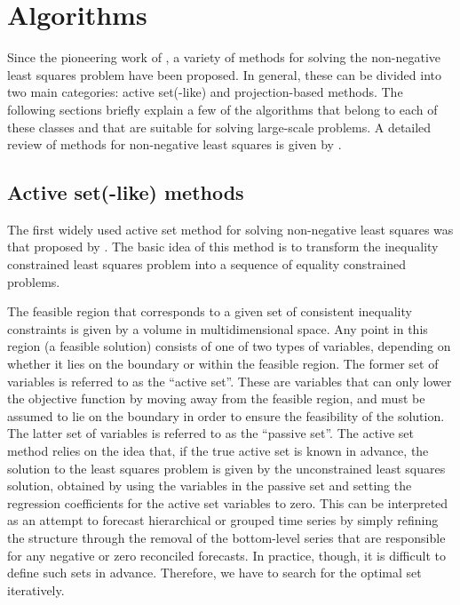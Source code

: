\documentclass[11pt]{article}
\newcommand{\0}{\phantom{0}}
\begin{document}
\section{Algorithms}\label{sec:quadalgo}

Since the pioneering work of \citet{Lawson1974}, a variety of methods for solving the non-negative least squares problem have been proposed. In general, these can be divided into two main categories: active set(-like) and projection-based methods. The following sections briefly explain a few of the algorithms that belong to each of these classes and that are suitable for solving large-scale problems. A detailed review of methods for non-negative least squares is given by \citet{Chen2009}.

\subsection{Active set(-like) methods}

The first widely used active set method for solving non-negative least squares was that proposed by \citet{Lawson1974}. The basic idea of this method is to transform the inequality constrained least squares problem into a sequence of equality constrained problems.

The feasible region that corresponds to a given set of consistent inequality constraints is given by a volume in multidimensional space. Any point in this region (a feasible solution) consists of one of two types of variables, depending on whether it lies on the boundary or within the feasible region. The former set of variables is referred to as the ``active set''. These are variables that can only lower the objective function by moving away from the feasible region, and must be assumed to lie on the boundary in order to ensure the feasibility of the solution. The latter set of variables is referred to as the ``passive set''. The active set method relies on the idea that, if the true active set is known in advance, the solution to the least squares problem is given by the unconstrained least squares solution, obtained by using the variables in the passive set and setting the regression coefficients for the active set variables to zero. This can be interpreted as an attempt to forecast hierarchical or grouped time series by simply refining the structure through the removal of the bottom-level series that are responsible for any negative or zero reconciled forecasts. In practice, though, it is difficult to define such sets in advance. Therefore, we have to search for the optimal set iteratively.
\end{document}
